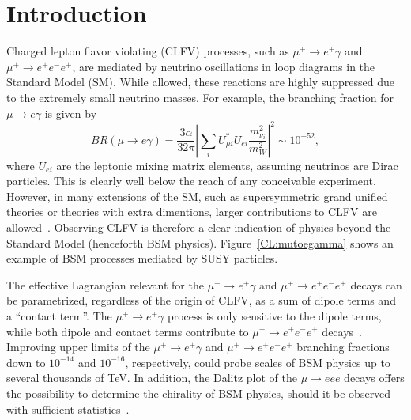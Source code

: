 \section{Introduction}
\label{sec:intro}

Charged lepton flavor violating (CLFV) processes, such as 
$\mu^+\to e^+\gamma$ and $\mu^+\to e^+e^-e^+$, are mediated by neutrino oscillations in loop diagrams in the Standard Model (SM). While allowed, these reactions are highly suppressed due to the extremely small neutrino masses. For example, the branching fraction for $\mu \to e \gamma$ is given by~\cite{xxx}
\begin{equation}
BR(\mu \rightarrow e \gamma)=\frac{3\alpha}{32\pi}\left|\sum_i U_{\mu
i}^* U_{e i}\frac{m_{\nu_{i}}^2}{m_{W}^2}\right|^2 \sim 10^{-52},
\end{equation}
where $U_{ei}$ are the leptonic mixing matrix elements, assuming neutrinos
are Dirac particles. This is clearly well below the reach of any conceivable experiment.
However, in many extensions of the SM, such as supersymmetric grand unified
theories or theories with extra dimentions, larger contributions to CLFV are
allowed~\cite{new physics}. Observing CLFV is therefore a clear indication of physics beyond the Standard Model (henceforth BSM physics). Figure~\ref{CL:mutoegamma} shows an example of BSM processes mediated by SUSY particles.

The effective Lagrangian relevant for the $\mu^+\to e^+\gamma$ and $\mu^+\to e^+e^-e^+$
decays can be parametrized, regardless of the origin of CLFV, as a sum of
dipole terms and a ``contact term''. The $\mu^+\to e^+\gamma$ process is only sensitive to the dipole terms, while both dipole and contact terms contribute to $\mu^+\to e^+e^-e^+$ decays~\cite{deGouvea:2013zba}. Improving upper limits of
the $\mu^+\to e^+\gamma$ and $\mu^+\to e^+e^-e^+$ branching fractions down to $10^{-14}$ and $10^{-16}$, respectively, could probe scales of BSM physics up to several thousands of TeV. In addition, the Dalitz plot of the $\mu \rightarrow eee$ decays offers the possibility to determine the chirality of BSM physics, should it be observed with sufficient statistics~\cite{Okada:1999zk}. 

